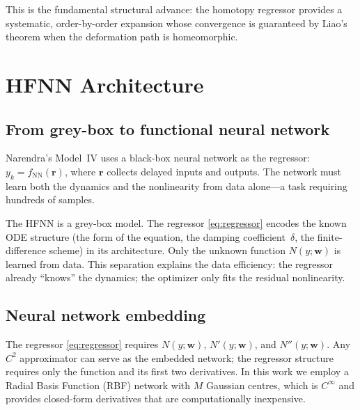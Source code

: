 \documentclass[preprint,12pt]{elsarticle}
\begin{document}
This is the fundamental structural advance: the homotopy regressor provides a systematic, order-by-order expansion whose convergence is guaranteed by Liao's theorem \cite{liao2003} when the deformation path is homeomorphic.


\section{HFNN Architecture}
\label{sec:architecture}

\subsection{From grey-box to functional neural network}
Narendra's Model~IV \cite{narendra1990} uses a black-box neural network as the regressor: $y_k = f_{\mathrm{NN}}(\mathbf{r})$, where $\mathbf{r}$ collects delayed inputs and outputs. The network must learn both the dynamics and the nonlinearity from data alone---a task requiring hundreds of samples.

The HFNN is a grey-box model. The regressor \eqref{eq:regressor} encodes the known ODE structure (the form of the equation, the damping coefficient~$\delta$, the finite-difference scheme) in its architecture. Only the unknown function $N(y;\mathbf{w})$ is learned from data. This separation explains the data efficiency: the regressor already ``knows'' the dynamics; the optimizer only fits the residual nonlinearity.

\subsection{Neural network embedding}
\label{sec:embedding}
The regressor \eqref{eq:regressor} requires $N(y;\mathbf{w})$, $N'(y;\mathbf{w})$, and $N''(y;\mathbf{w})$. Any $C^2$ approximator can serve as the embedded network; the regressor structure requires only the function and its first two derivatives. In this work we employ a Radial Basis Function (RBF) network with $M$ Gaussian centres, which is $C^\infty$ and provides closed-form derivatives that are computationally inexpensive.
\end{document}

